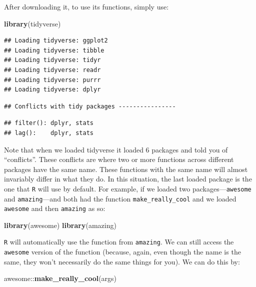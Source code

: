 \documentclass[]{tufte-book}
\newenvironment{Shaded}{}{}
\newcommand{\KeywordTok}[1]{\textcolor[rgb]{0.00,0.44,0.13}{\textbf{#1}}}
\newcommand{\OperatorTok}[1]{\textcolor[rgb]{0.40,0.40,0.40}{#1}}
\newcommand{\NormalTok}[1]{#1}
\theoremstyle{definition}
\theoremstyle{definition}
\theoremstyle{remark}
\begin{document}
After downloading it, to use its functions, simply use:

\begin{Shaded}
\begin{Highlighting}[]
\KeywordTok{library}\NormalTok{(tidyverse)}
\end{Highlighting}
\end{Shaded}

\begin{verbatim}
## Loading tidyverse: ggplot2
## Loading tidyverse: tibble
## Loading tidyverse: tidyr
## Loading tidyverse: readr
## Loading tidyverse: purrr
## Loading tidyverse: dplyr
\end{verbatim}

\begin{verbatim}
## Conflicts with tidy packages ----------------
\end{verbatim}

\begin{verbatim}
## filter(): dplyr, stats
## lag():    dplyr, stats
\end{verbatim}

Note that when we loaded tidyverse it loaded 6 packages and told you of
``conflicts''. These conflicts are where two or more functions across
different packages have the same name. These functions with the same
name will almost invariably differ in what they do. In this situation,
the last loaded package is the one that \texttt{R} will use by default.
For example, if we loaded two packages---\texttt{awesome} and
\texttt{amazing}---and both had the function \texttt{make\_really\_cool}
and we loaded \texttt{awesome} and then \texttt{amazing} as so:

\begin{Shaded}
\begin{Highlighting}[]
\KeywordTok{library}\NormalTok{(awesome)}
\KeywordTok{library}\NormalTok{(amazing)}
\end{Highlighting}
\end{Shaded}

\texttt{R} will automatically use the function from \texttt{amazing}. We
can still access the \texttt{awesome} version of the function (because,
again, even though the name is the same, they won't necessarily do the
same things for you). We can do this by:

\begin{Shaded}
\begin{Highlighting}[]
\NormalTok{awesome}\OperatorTok{::}\KeywordTok{make_really_cool}\NormalTok{(args)}
\end{Highlighting}
\end{Shaded}
\end{document}
